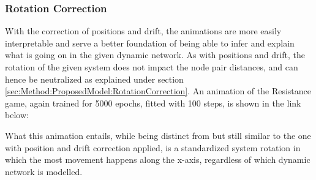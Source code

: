 \subsubsection{Rotation Correction}
\label{sec:ResearchQuestion3:RotationCorrection}
With the correction of positions and drift, the animations are more easily interpretable and serve a better foundation of being able to infer and explain what is going on in the given dynamic network.
As with positions and drift, the rotation of the given system does not impact the node pair distances, and can hence be neutralized as explained under section \ref{sec:Method:ProposedModel:RotationCorrection}.
An animation of the Resistance game, again trained for 5000 epochs, fitted with 100 steps, is shown in the link below:
\begin{center}
\end{center}
\noindent
What this animation entails, while being distinct from but still similar to the one with position and drift correction applied, is a standardized system rotation in which the most movement happens along the x-axis, regardless of which dynamic network is modelled.

